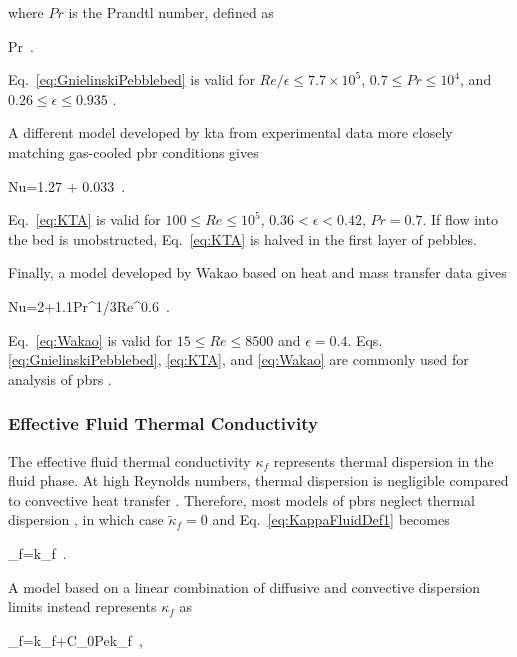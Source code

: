 \noindent where \(Pr\) is the Prandtl number, defined as

\beq
\label{eq:Prandtl}
Pr\equiv{}\ .
\eeq

\noindent Eq.\ \eqref{eq:GnielinskiPebblebed} is valid for \(Re/\epsilon \leq 7.7\times 10^5\), \(0.7\leq Pr\leq 10^4\), and \(0.26\leq\epsilon\leq 0.935\) \cite{achenbach}. 

A different model developed by \gls{kta} from experimental data more closely matching gas-cooled \gls{pbr} conditions gives \cite{KTAhtc}

\beq
\label{eq:KTA}
Nu=1.27  + 0.033\ .
\eeq

\noindent Eq.\ \eqref{eq:KTA} is valid for \(100 \leq Re \leq 10^5\), \(0.36< \epsilon< 0.42\), \(Pr=0.7\). If flow into the bed is unobstructed, Eq.\ \eqref{eq:KTA} is halved in the first layer of pebbles.

Finally, a model developed by Wakao based on heat and mass transfer data gives \cite{wakao}

\beq
\label{eq:Wakao}
Nu=2+1.1Pr^{1/3}Re^{0.6}\ .
\eeq

\noindent Eq.\ \eqref{eq:Wakao} is valid for \(15\leq Re\leq8500\) and \(\epsilon=0.4\). Eqs. \eqref{eq:GnielinskiPebblebed}, \eqref{eq:KTA}, and \eqref{eq:Wakao} are commonly used for analysis of \glspl{pbr} \cite{auwerda_2011, becker, becker2003,avigni,gao, suikkanen,scarlat,y_li,xin_wang_thesis,cai}.

\subsubsection{Effective Fluid Thermal Conductivity}
\label{sec:Kappa}

The effective fluid thermal conductivity \(\kappa_f\) represents thermal dispersion in the fluid phase. At high Reynolds numbers, thermal dispersion is negligible compared to convective heat transfer \cite{gunn1987_htc,littman}. Therefore, most models of \glspl{pbr} neglect thermal dispersion \cite{suikkanen,y_li}, in which case \(\tilde{\kappa}_f=0\) and Eq.\ \eqref{eq:KappaFluidDef1} becomes

\beq
\label{eq:KappaFluidBasic}
\kappa_f=\epsilon k_f\ .
\eeq

\noindent A model based on a linear combination of diffusive and convective dispersion limits instead represents \(\kappa_f\) as

\beq
\label{eq:LinearPecletKappaFluid}
\kappa_f=\epsilon k_f+C_0Pek_f\ ,
\eeq

